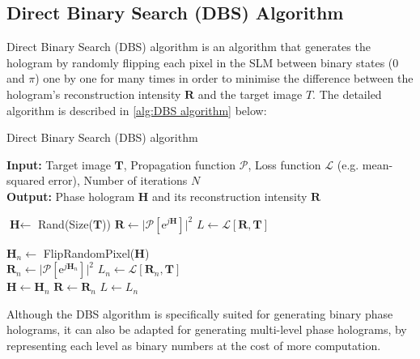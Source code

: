 \newpage
\subsection{Direct Binary Search (DBS) Algorithm}\label{sec:Direct Binary Search (DBS) Algorithm}
Direct Binary Search (DBS) algorithm \cite{Seldowitz1987} is an algorithm that generates the hologram by randomly flipping each pixel in the SLM between binary states (0 and $\pi$) one by one for many times in order to minimise the difference between the hologram's reconstruction intensity $\textbf{R}$ and the target image $T$. The detailed algorithm is described in \cref{alg:DBS algorithm} below:
\begin{algorithm}[H]
  \caption{Direct Binary Search (DBS) algorithm}\label{alg:DBS algorithm}
  \textbf{Input:} Target image $\textbf{T}$, Propagation function $\mathcal{P}$, Loss function $\mathcal{L}$ (e.g. mean-squared error), Number of iterations $N$ \\
  \textbf{Output:} Phase hologram $\textbf{H}$ and its reconstruction intensity $\textbf{R}$
  \begin{algorithmic}
    \State $\textbf{H} \gets$ Rand(Size($\textbf{T}$))
    \State $\textbf{R} \gets \vert \mathcal{P}[\mathrm{e}^{j\textbf{H}}] \vert ^2$
    \State $L \gets \mathcal{L} [\textbf{R}, \textbf{T}]$

    \State $\textbf{H}_n \gets$ FlipRandomPixel($\textbf{H}$)\\
    \State $\textbf{R}_n \gets \vert \mathcal{P}[\mathrm{e}^{j\textbf{H}_n}] \vert ^2$
    \State $L_n \gets \mathcal{L} [\textbf{R}_n, \textbf{T}]$\\
    \State $\textbf{H} \gets \textbf{H}_n$
    \State $\textbf{R} \gets \textbf{R}_n$
    \State $L \gets L_n$
    \EndIf
    \EndFor
  \end{algorithmic}
\end{algorithm}

Although the DBS algorithm is specifically suited for generating binary phase holograms, it can also be adapted for generating multi-level phase holograms, by representing each level as binary numbers at the cost of more computation.

